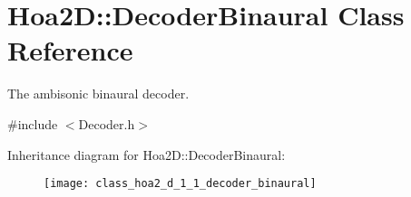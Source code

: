 \hypertarget{class_hoa2_d_1_1_decoder_binaural}{\section{Hoa2\-D\-:\-:Decoder\-Binaural Class Reference}
\label{class_hoa2_d_1_1_decoder_binaural}
}


The ambisonic binaural decoder.  




{\ttfamily \#include $<$Decoder.\-h$>$}

Inheritance diagram for Hoa2\-D\-:\-:Decoder\-Binaural\-:\begin{figure}[H]
\begin{center}
\leavevmode
\texttt{[image: class\_hoa2\_d\_1\_1\_decoder\_binaural]}
\end{center}
\end{figure}
